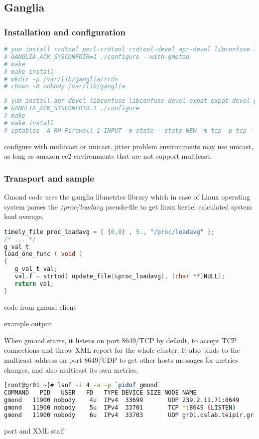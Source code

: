 \subsection{Ganglia}

\subsubsection{Installation and configuration}

\begin{lstlisting}[language=bash,caption=Gmetad installation]
# yum install rrdtool perl-rrdtool rrdtool-devel apr-devel libconfuse libconfuse-devel expat expat-devel pcre pcre-devel
# GANGLIA_ACK_SYSCONFDIR=1 ./configure --with-gmetad
# make
# make install
# mkdir -p /var/lib/ganglia/rrds
# chown -R nobody /var/lib/ganglia
\end{lstlisting}

\begin{lstlisting}[language=bash,caption=Gmond installation]
# yum install apr-devel libconfuse libconfuse-devel expat expat-devel pcre pcre-devel
# GANGLIA_ACK_SYSCONFDIR=1 ./configure
# make
# make install
# iptables -A RH-Firewall-1-INPUT -m state --state NEW -m tcp -p tcp --dport 8649 -j ACCEPT
\end{lstlisting}

configure with multicast or unicast. jitter problem environments may use unicast, as long as amazon ec2 environments that are not support multicast.

\subsubsection{Transport and sample}
Gmond code uses the ganglia libmetrics library which in case of Linux operating system parses the $/proc/loadavg$ pseudo-file to get linux kernel calculated system load average.

\begin{lstlisting}[language=C,caption=libmetrics code to get load average]
timely_file proc_loadavg = { {0,0} , 5., "/proc/loadavg" };
/* ... */
g_val_t
load_one_func ( void )
{
   g_val_t val;
   val.f = strtod( update_file(&proc_loadavg), (char **)NULL);
   return val;
}
\end{lstlisting}
code from gmond client

example output 

When gmond starts, it listens on port 8649/TCP by default, to accept TCP connections and throw XML report for the whole cluster. It also binds to the multicast address on port 8649/UDP to get other hosts messages for metrics changes, and also multicast its own metrics.
\begin{lstlisting}[language=bash,caption=Gmond networking]
[root@gr01 ~]# lsof -i 4 -a -p `pidof gmond`
COMMAND   PID   USER   FD   TYPE DEVICE SIZE NODE NAME
gmond   11900 nobody    4u  IPv4  33699       UDP 239.2.11.71:8649 
gmond   11900 nobody    5u  IPv4  33701       TCP *:8649 (LISTEN)
gmond   11900 nobody    6u  IPv4  33703       UDP gr01.oslab.teipir.gr:39991->239.2.11.71:8649 
\end{lstlisting}
port and XML staff

